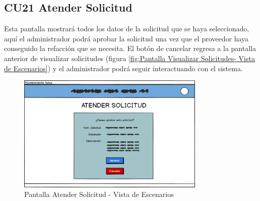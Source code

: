 \subsection{CU21 Atender Solicitud}
Esta pantalla mostrará todos los datos de la solicitud que se haya seleccionado, aquí el administrador podrá aprobar la solicitud una vez que el proveedor haya conseguido la refacción que se necesita. El botón de cancelar regresa a la pantalla anterior de visualizar solicitudes (figura \ref{fig:Pantalla Visualizar Solicitudes- Vista de Escenarios}) y el administrador podrá seguir interactuando con el sistema. 
\begin{figure}[!h]
	\centering
	\includegraphics[width=0.8\textwidth]{./diseno/vescenarios/imagenes/eliminarSolicitud}
	\caption{Pantalla Atender Solicitud - Vista de Escenarios}
	\label{fig:Pantalla Atender - Vista de Escenarios}
\end{figure}
\clearpage